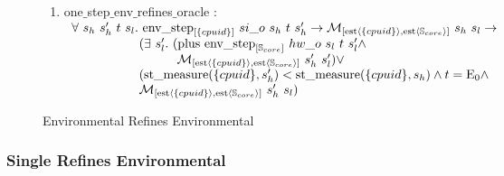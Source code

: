 \begin{figure}
\begin{enumerate}
\item one$\_$step$\_$env$\_$refines$\_$oracle : \\
$
\begin{array}{l}
\forall \ s_h \ s_h' \ t \ s_l. \ \envstep{\set{cpuid}}{si\_o}{s_h}{t}{s_h'} \rightarrow  \matchestateestate{\set{cpuid}}{s_h}{s_l} \rightarrow \\
\ \ \ \ \ \ \ \ \ \ \ \ \ \ \ \ (\exists \ s_l' .\ (\ccplusstep{\envstep{\coreset}{hw\_o}{s_l}{t}{s_l'}} \wedge\\
\ \ \ \ \ \ \ \ \ \ \ \ \ \ \ \ \ \ \ \ \ \ \ \ \  \matchestateestate{\set{cpuid}}{s_h'}{s_l'}) \vee \\ 
\ \ \ \ \ \ \ \ \ \ \ \ \ \ \ \ (\mcstatemeasurenoeq{\set{cpuid}}{s_h'} < \mcstatemeasurenoeq{\set{cpuid}}{s_h} \wedge t = \ccemptytrace \wedge \\ 
\ \ \ \ \ \ \ \ \ \ \ \ \ \ \ \ \matchestateestate{\set{cpuid}}{s_h'}{s_l})\\
\end{array}
$
\end{enumerate}


\caption{Environmental Refines Environmental}
\label{fig:env-refines-env}
\end{figure}


\clearpage


\subsubsection{Single Refines Environmental}
\label{subsubsec:single-refines-emv}

